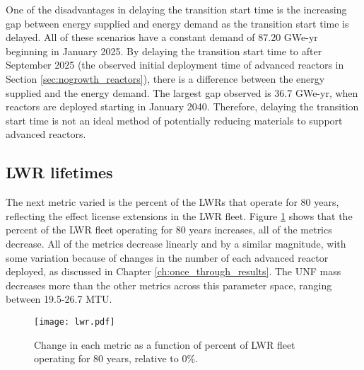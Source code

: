 One of the disadvantages in delaying the transition start time is the 
increasing gap between energy supplied and energy demand as the transition 
start time is delayed. All of these scenarios have a constant demand 
of 87.20 GWe-yr beginning in January 2025. By delaying the transition start 
time to after September 2025 (the observed initial deployment time of advanced 
reactors in Section \ref{sec:nogrowth_reactors}), there is a difference
between the energy supplied and the energy demand. The largest gap observed 
is 36.7
GWe-yr, when reactors are deployed starting in January 2040. Therefore, 
delaying the transition start time is not an ideal method of 
potentially reducing materials to support advanced reactors. 

\subsection{LWR lifetimes}
The next metric varied is the percent of the \glspl{LWR} that operate for 
80 years, reflecting the effect license extensions in the \gls{LWR} fleet. 
Figure \ref{fig:lwr_scenario7} shows that the percent of the \gls{LWR} 
fleet operating for 80 years increases, all of the metrics decrease. 
All of the metrics decrease 
linearly and by a similar magnitude, with some variation because 
of changes in the number of each advanced reactor deployed, as discussed 
in Chapter \ref{ch:once_through_results}. The \gls{UNF} mass decreases 
more than the other metrics across 
this parameter space, ranging between 19.5-26.7 MTU.

\begin{figure}[h!]
    \centering
    \texttt{[image: lwr.pdf]}
    \caption{Change in each metric as a function of percent of LWR fleet  
    operating for 80 years, relative to 0\%.}
    \label{fig:lwr_scenario7}
\end{figure}

